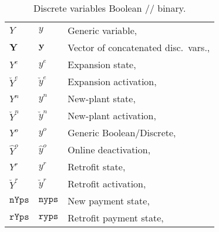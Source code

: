 \documentclass{amsbook}
\begin{document}
\begin{table}[h]
    \caption{Discrete variables Boolean // binary.}
    \begin{tabular}{@{}lll@{}}
        $Y$ & $y$ & Generic variable, \\
        $\bm{Y}$ & $\bm{y}$ & Vector of concatenated disc.\ vars., \\
        $Y^e$ & $y^e$ & Expansion state, \\
        $\check{Y}^e$ & $\check{y}^e$ & Expansion activation, \\
        $Y^n$ & $y^n$ & New-plant state, \\
        $\check{Y}^n$ & $\check{y}^n$ & New-plant activation, \\
        $Y^o$ & $y^o$ & Generic Boolean/Discrete, \\
        $\hat{Y}^o$ & $\hat{y}^o$ & Online deactivation, \\
        $Y^r$ & $y^r$ & Retrofit state, \\
        $\check{Y}^r$ & $\check{y}^r$ & Retrofit activation, \\
        $\mathtt{nYps}$ & $\mathtt{nyps}$ & New payment state, \\
        $\mathtt{rYps}$ & $\mathtt{ryps}$ & Retrofit payment state, \\
    \end{tabular}\label{tab:bools}
\end{table}
%
\end{document}
